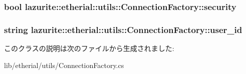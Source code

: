 \hypertarget{classlazurite_1_1etherial_1_1utils_1_1_connection_factory_a3d6d6b9fabb64498c97ee756d62b4012}{
\subsubsection[{security}]{\setlength{\rightskip}{0pt plus 5cm}bool lazurite::etherial::utils::ConnectionFactory::security}}
\label{classlazurite_1_1etherial_1_1utils_1_1_connection_factory_a3d6d6b9fabb64498c97ee756d62b4012}
\hypertarget{classlazurite_1_1etherial_1_1utils_1_1_connection_factory_a51b9fca8f8b392387d854750c14fbf3a}{
\subsubsection[{user\_\-id}]{\setlength{\rightskip}{0pt plus 5cm}string lazurite::etherial::utils::ConnectionFactory::user\_\-id}}
\label{classlazurite_1_1etherial_1_1utils_1_1_connection_factory_a51b9fca8f8b392387d854750c14fbf3a}


このクラスの説明は次のファイルから生成されました:\begin{DoxyCompactItemize}
\item 
lib/etherial/utils/ConnectionFactory.cs\end{DoxyCompactItemize}
